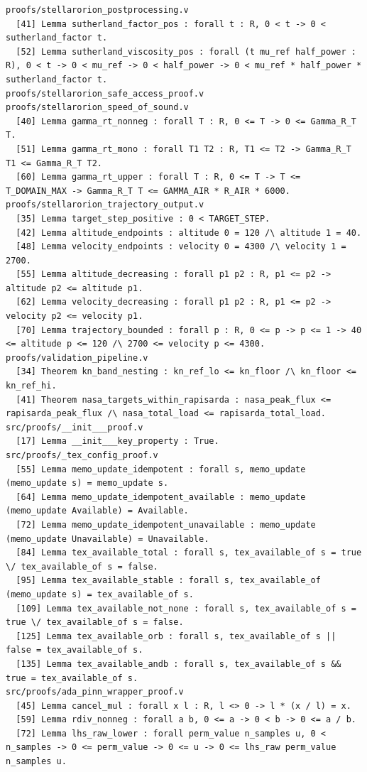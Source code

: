 \documentclass[11pt]{article}
\theoremstyle{definition}
\begin{document}
\begin{verbatim}
proofs/stellarorion_postprocessing.v
  [41] Lemma sutherland_factor_pos : forall t : R, 0 < t -> 0 < sutherland_factor t.
  [52] Lemma sutherland_viscosity_pos : forall (t mu_ref half_power : R), 0 < t -> 0 < mu_ref -> 0 < half_power -> 0 < mu_ref * half_power * sutherland_factor t.
proofs/stellarorion_safe_access_proof.v
proofs/stellarorion_speed_of_sound.v
  [40] Lemma gamma_rt_nonneg : forall T : R, 0 <= T -> 0 <= Gamma_R_T T.
  [51] Lemma gamma_rt_mono : forall T1 T2 : R, T1 <= T2 -> Gamma_R_T T1 <= Gamma_R_T T2.
  [60] Lemma gamma_rt_upper : forall T : R, 0 <= T -> T <= T_DOMAIN_MAX -> Gamma_R_T T <= GAMMA_AIR * R_AIR * 6000.
proofs/stellarorion_trajectory_output.v
  [35] Lemma target_step_positive : 0 < TARGET_STEP.
  [42] Lemma altitude_endpoints : altitude 0 = 120 /\ altitude 1 = 40.
  [48] Lemma velocity_endpoints : velocity 0 = 4300 /\ velocity 1 = 2700.
  [55] Lemma altitude_decreasing : forall p1 p2 : R, p1 <= p2 -> altitude p2 <= altitude p1.
  [62] Lemma velocity_decreasing : forall p1 p2 : R, p1 <= p2 -> velocity p2 <= velocity p1.
  [70] Lemma trajectory_bounded : forall p : R, 0 <= p -> p <= 1 -> 40 <= altitude p <= 120 /\ 2700 <= velocity p <= 4300.
proofs/validation_pipeline.v
  [34] Theorem kn_band_nesting : kn_ref_lo <= kn_floor /\ kn_floor <= kn_ref_hi.
  [41] Theorem nasa_targets_within_rapisarda : nasa_peak_flux <= rapisarda_peak_flux /\ nasa_total_load <= rapisarda_total_load.
src/proofs/__init___proof.v
  [17] Lemma __init___key_property : True.
src/proofs/_tex_config_proof.v
  [55] Lemma memo_update_idempotent : forall s, memo_update (memo_update s) = memo_update s.
  [64] Lemma memo_update_idempotent_available : memo_update (memo_update Available) = Available.
  [72] Lemma memo_update_idempotent_unavailable : memo_update (memo_update Unavailable) = Unavailable.
  [84] Lemma tex_available_total : forall s, tex_available_of s = true \/ tex_available_of s = false.
  [95] Lemma tex_available_stable : forall s, tex_available_of (memo_update s) = tex_available_of s.
  [109] Lemma tex_available_not_none : forall s, tex_available_of s = true \/ tex_available_of s = false.
  [125] Lemma tex_available_orb : forall s, tex_available_of s || false = tex_available_of s.
  [135] Lemma tex_available_andb : forall s, tex_available_of s && true = tex_available_of s.
src/proofs/ada_pinn_wrapper_proof.v
  [45] Lemma cancel_mul : forall x l : R, l <> 0 -> l * (x / l) = x.
  [59] Lemma rdiv_nonneg : forall a b, 0 <= a -> 0 < b -> 0 <= a / b.
  [72] Lemma lhs_raw_lower : forall perm_value n_samples u, 0 < n_samples -> 0 <= perm_value -> 0 <= u -> 0 <= lhs_raw perm_value n_samples u.

\end{verbatim}
\end{document}
